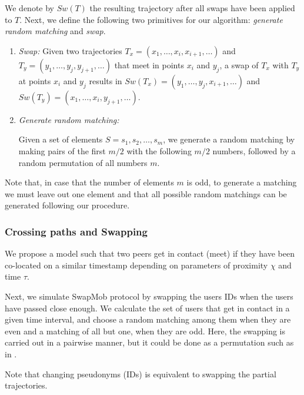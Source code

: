 \documentclass{llncs}
\begin{document}
We denote by $Sw(T)$ the resulting trajectory after all swaps have been applied to $T$.
Next, we define the following two primitives for our algorithm: \emph{generate random matching} and \emph{swap}.
\begin{enumerate}

\item \emph{Swap:}
Given two trajectories $T_x = (x_1, \ldots, x_i, x_{i+1}, \ldots)$ and \linebreak
$T_y= (y_1, \ldots, y_j, y_{j+1}, \ldots)$ that meet in points $x_i$ and $y_j$, a swap of $T_x$ with $T_y$ at points $x_i$ and $y_j$ results in $Sw(T_x) = (y_1, \ldots, y_j, x_{i+1}, \ldots)$ and
\linebreak
$Sw(T_y)= (x_1, \ldots, x_i, y_{j+1}, \ldots)$.
\item \emph{Generate random matching:}

Given a set of elements $S = s_1, s_2,\ldots, s_m$, we generate a random matching by making pairs of the first $m/2$ with the following $m/2$ numbers, followed by a random permutation of all numbers $m$.
\end{enumerate}

Note that, in case that the number of elements $m$ is odd, to generate a matching we must leave out one element and that all possible random matchings can be generated following our procedure.

\subsubsection{Crossing paths and Swapping} \label{sec:cross}
We propose a model such that two peers get in contact (meet) if they have been co-located on a similar timestamp depending on parameters of proximity $\chi$ and time $\tau$.


Next, we simulate SwapMob protocol by swapping the users IDs when the users have passed close enough.
We calculate the set of users that get in contact in a given time interval, and choose a random matching among them when they are even and a matching of all but one, when they are odd.
Here, the swapping is carried out in a pairwise manner, but it could be done as a permutation such as in \cite{Beresford04mixzones}.

Note that changing pseudonyms (IDs) is equivalent to swapping the partial trajectories.
\end{document}
